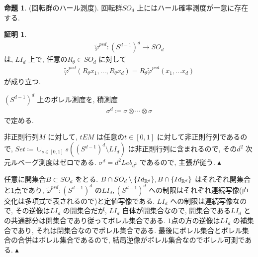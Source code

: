 \documentclass[10pt, fleqn, label-section=none]{bxjsarticle}
\theoremstyle{definition}
\newtheorem{prop}[dfn]{命題}
\newtheorem*{pf*}{証明}
\newcommand{\cbra}[1]{\mleft\{#1\mright\}}
\renewcommand{\;}{\, ; \,}
\newenvironment{claim}[1]{\par\noindent\underline{step:}\space#1}{}
\newenvironment{claimproof}[1]{\par\noindent{($\because$)}\space#1}{\hfill $\blacktriangle $}
\begin{document}
\begin{prop}(回転群のハール測度). 回転群$SO_d$ 上にはハール確率測度が一意に存在する. 

\end{prop}
\begin{pf*}


\begin{align*} \tilde \varphi^{psd} : (S^{d-1})^d \rightarrow SO_d \end{align*}
は, $LI_d$ 上で, 任意の$R_\theta \in SO_d$ に対して
\begin{align*} \tilde \varphi^{psd}(R_\theta x_1, \ldots , R_\theta x_d) = R_\theta \tilde \varphi^{psd} (x_1, \ldots x_d) \end{align*} が成り立つ. 



$(S^{d-1})^d$ 上のボレル測度を, 積測度
\begin{align*} \sigma^d \coloneqq \sigma \otimes \cdots \otimes \sigma \end{align*}
で定める. 

\begin{claimproof}

非正則行列$M$ に対して, $tEM$ は任意の$t \in [0,1] $ に対して非正則行列であるので, $Set \coloneqq \cup_{s \in [0,1]} s ((S^{d-1})^d \setminus LI_d  )$ は非正則行列に含まれるので, その$d^2$ 次元ルベーグ測度はゼロである. 
$\sigma^d = d^2 Leb_{d^2}$ であるので, 主張が従う. 
\end{claimproof}

\begin{claimproof}
任意に開集合$B \subset SO_d$ をとる. $ B \cap SO_d\setminus \cbra{Id_{\mathbb R^d} } , B \cap  \cbra{Id_{\mathbb R^d} } $ はそれぞれ開集合と$1$点であり, $\tilde \varphi^{psd} : (S^{d-1})^d $ の$LI_d, (S^{d-1})^d$ への制限はそれぞれ連続写像(直交化は多項式で表されるので)と定値写像である. $LI_d$ への制限は連続写像なので, その逆像は$LI_d$ の開集合だが, $LI_d$ 自体が開集合なので, 開集合である$LI_d$ との共通部分は開集合であり従ってボレル集合である. $1$点の方の逆像は$LI_d$ の補集合であり, それは閉集合なのでボレル集合である. 最後にボレル集合とボレル集合の合併はボレル集合であるので, 結局逆像がボレル集合なのでボレル可測である.
\end{claimproof}


\end{pf*}
\end{document}
